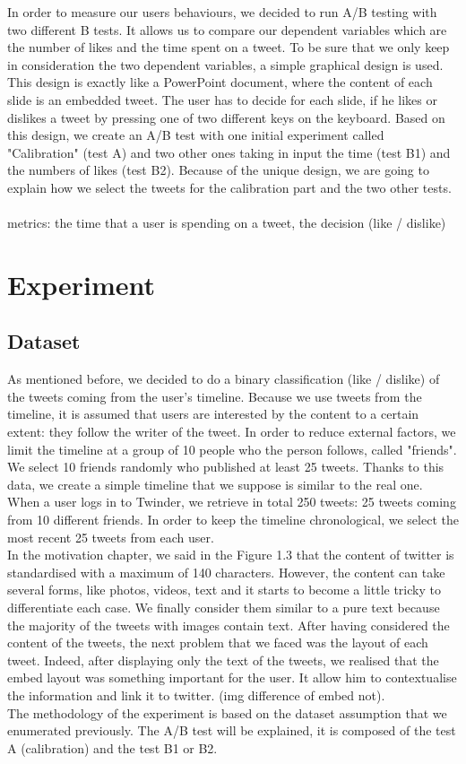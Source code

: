 In order to measure our users behaviours, we decided to run A/B testing with two different B tests. It allows us 
to compare our dependent variables which are the number of likes and the time spent on a tweet. To be sure 
that we only keep in consideration the two dependent variables, a simple graphical design is used. This 
design is exactly like a PowerPoint document, where the content of each slide is an embedded tweet. The 
user has to decide for each slide, if he likes or dislikes a tweet by pressing one of two different keys on the 
keyboard. Based on this design, we create an A/B test with one initial experiment called "Calibration" (test A) 
and two other ones taking in input the time (test B1) and the numbers of likes (test B2). Because of the unique 
design, we are going to explain how we select the tweets for the calibration part and the two other tests. \\
\\
metrics: the time that a user is spending on a tweet, the decision (like / dislike) 

\section{Experiment}

\subsection{Dataset}

As mentioned before, we decided to do a binary classification (like / dislike) of the tweets coming from the 
user's timeline. Because we use tweets from the timeline, it is assumed that users are interested by the 
content to a certain extent: they follow the writer of the tweet. In order to reduce external factors, we limit the 
timeline at a group of 10 people who the person follows, called "friends". We select 10 friends randomly who 
published at least 25 tweets. Thanks to this data, we create a simple timeline that we suppose is similar to the 
real one. When a user logs in to Twinder, we retrieve in total 250 tweets: 25 tweets coming from 10 different 
friends. In order to keep the timeline chronological, we select the most recent 25 tweets from each user. \\
In the motivation chapter, we said in the Figure 1.3 that the content of twitter is standardised with a maximum of 140 characters. However, the content can take several forms, like photos, videos, text and it starts to become a little tricky to differentiate each case. We finally consider them similar to a pure text because the majority of the tweets with images contain text. After having considered the content of the tweets, the next problem that we faced was the layout of each tweet. Indeed, after displaying only the text of the tweets, we realised that the embed layout was something important for the user. It allow him to contextualise the information and link it to twitter. (img difference of embed not). \\
The methodology of the experiment is based on the dataset assumption that we enumerated previously. The 
A/B test will be explained, it is composed of the test A (calibration) and the test B1 or B2.  

